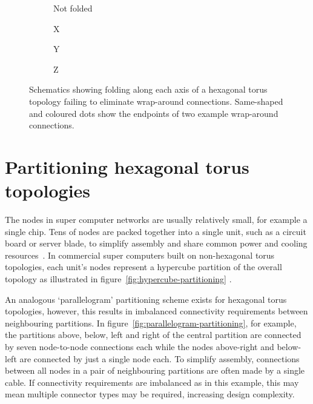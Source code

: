 		\begin{figure}
			\center
			\begin{subfigure}[b]{0.24\linewidth}
				\center
				\caption{Not folded}
				\label{fig:failing-to-fold-hex-toruses-none}
			\end{subfigure}
			\begin{subfigure}[b]{0.24\linewidth}
				\center
				\caption{X}
				\label{fig:failing-to-fold-hex-toruses-x}
			\end{subfigure}
			\begin{subfigure}[b]{0.24\linewidth}
				\center
				\caption{Y}
				\label{fig:failing-to-fold-hex-toruses-y}
			\end{subfigure}
			\begin{subfigure}[b]{0.24\linewidth}
				\center
				\caption{Z}
				\label{fig:failing-to-fold-hex-toruses-z}
			\end{subfigure}
			
			\caption[Folding each axis of a hexagonal torus topology]%
			{Schematics showing folding along each axis of a hexagonal
			torus topology failing to eliminate wrap-around connections.  Same-shaped
			and coloured dots show the endpoints of two example wrap-around
			connections.}
			\label{fig:failing-to-fold-hex-toruses}
		\end{figure}
	
	\section{Partitioning hexagonal torus topologies}
		
		The nodes in super computer networks are usually relatively small, for
		example a single chip. Tens of nodes are packed together into a single
		unit, such as a circuit board or server blade, to simplify assembly and
		share common power and cooling resources~\cite{gilge14,ajima12}. In
		commercial super computers built on non-hexagonal torus topologies, each
		unit's nodes represent a hypercube partition of the overall topology as
		illustrated in figure~\ref{fig:hypercube-partitioning}
		\cite{chen11,ajima12}.
		
		An analogous `parallelogram' partitioning scheme exists for hexagonal torus
		topologies, however, this results in imbalanced connectivity requirements
		between neighbouring partitions. In
		figure~\ref{fig:parallelogram-partitioning}, for example, the partitions
		above, below, left and right of the central partition are connected by
		seven node-to-node connections each while the nodes above-right and
		below-left are connected by just a single node each. To simplify assembly,
		connections between all nodes in a pair of neighbouring partitions are
		often made by a single cable. If connectivity requirements are imbalanced
		as in this example, this may mean multiple connector types may be required,
		increasing design complexity.
		
